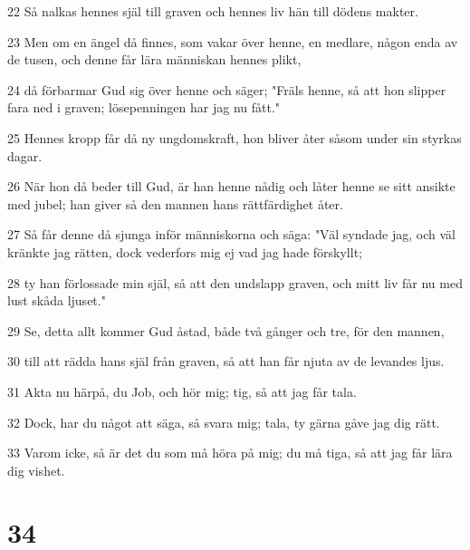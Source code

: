 \par 22 Så nalkas hennes själ till graven och hennes liv hän till dödens makter.
\par 23 Men om en ängel då finnes, som vakar över henne, en medlare, någon enda av de tusen, och denne får lära människan hennes plikt,
\par 24 då förbarmar Gud sig över henne och säger; "Fräls henne, så att hon slipper fara ned i graven; lösepenningen har jag nu fått."
\par 25 Hennes kropp får då ny ungdomskraft, hon bliver åter såsom under sin styrkas dagar.
\par 26 När hon då beder till Gud, är han henne nådig och låter henne se sitt ansikte med jubel; han giver så den mannen hans rättfärdighet åter.
\par 27 Så får denne då sjunga inför människorna och säga: "Väl syndade jag, och väl kränkte jag rätten, dock vederfors mig ej vad jag hade förskyllt;
\par 28 ty han förlossade min själ, så att den undslapp graven, och mitt liv får nu med lust skåda ljuset."
\par 29 Se, detta allt kommer Gud åstad, både två gånger och tre, för den mannen,
\par 30 till att rädda hans själ från graven, så att han får njuta av de levandes ljus.
\par 31 Akta nu härpå, du Job, och hör mig; tig, så att jag får tala.
\par 32 Dock, har du något att säga, så svara mig; tala, ty gärna gåve jag dig rätt.
\par 33 Varom icke, så är det du som må höra på mig; du må tiga, så att jag får lära dig vishet.

\chapter{34}

